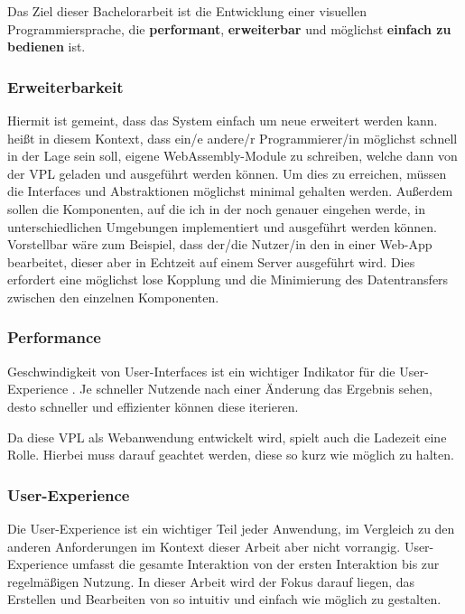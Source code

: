 \documentclass[ngerman]{article}
\begin{document}
Das Ziel dieser Bachelorarbeit ist die Entwicklung einer visuellen Programmiersprache, die \textbf{performant}, \textbf{erweiterbar} und möglichst \textbf{einfach zu bedienen} ist.

\subsubsection{Erweiterbarkeit}

Hiermit ist gemeint, dass das System einfach um neue  erweitert werden kann.
 heißt in diesem Kontext, dass ein/e andere/r Programmierer/in möglichst 
schnell in der Lage sein soll, eigene WebAssembly-Module zu schreiben, welche dann von der VPL geladen und ausgeführt werden können.
Um dies zu erreichen, müssen die Interfaces und Abstraktionen möglichst minimal gehalten werden.
\br
Außerdem sollen die Komponenten, auf die ich in der  noch genauer eingehen werde, in unterschiedlichen Umgebungen implementiert und ausgeführt werden können.
Vorstellbar wäre zum Beispiel, dass der/die Nutzer/in den  in einer Web-App bearbeitet, dieser aber in Echtzeit auf einem Server ausgeführt wird. 
Dies erfordert eine möglichst lose Kopplung und die Minimierung des Datentransfers zwischen den einzelnen Komponenten.

\subsubsection{Performance}

Geschwindigkeit von User-Interfaces ist ein wichtiger Indikator für die User-Experience \cite{6876022}. 
Je schneller Nutzende nach einer Änderung das Ergebnis sehen, desto schneller und effizienter können diese iterieren. 

Da diese VPL als Webanwendung entwickelt wird, spielt auch die Ladezeit eine Rolle. 
Hierbei muss darauf geachtet werden, diese so kurz wie möglich zu halten.

\subsubsection{User-Experience}

Die User-Experience ist ein wichtiger Teil jeder Anwendung, im Vergleich zu den anderen Anforderungen im Kontext dieser Arbeit aber nicht vorrangig. User-Experience umfasst die gesamte Interaktion von der ersten Interaktion bis zur regelmäßigen Nutzung. In dieser Arbeit wird der Fokus darauf liegen, das Erstellen und Bearbeiten von  so intuitiv und einfach wie möglich zu gestalten.
\end{document}
